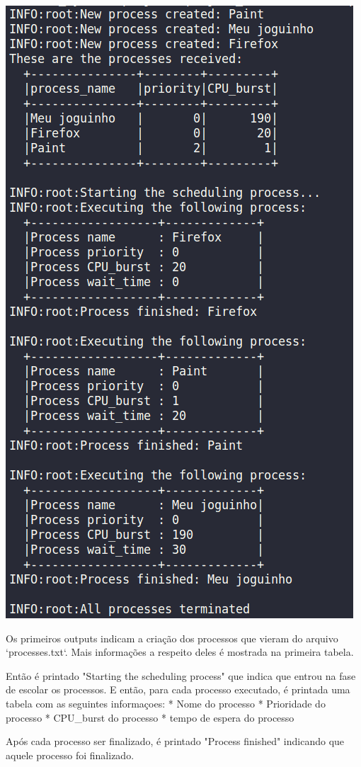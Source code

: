 \includegraphics{images/SO_p1p1}

Os primeiros outputs indicam a criação dos processos que vieram do arquivo `processes.txt`. Mais informações a respeito deles é mostrada na primeira tabela.

Então é printado "Starting the scheduling process" que indica que entrou na fase de escolar os processos. E então, para cada processo executado, é printada uma tabela com as seguintes informaçoes:
* Nome do processo
* Prioridade do processo
* CPU_burst do processo
* tempo de espera do processo

Após cada processo ser finalizado, é printado "Process finished" indicando que aquele processo foi finalizado.

